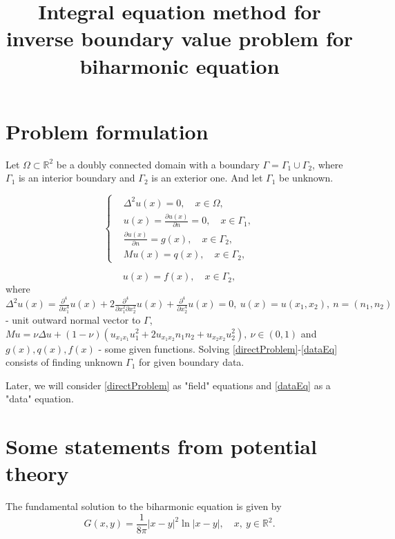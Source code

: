 \documentclass[12pt]{article}
\title{Integral equation method for inverse boundary value problem for biharmonic equation}
\date{}
\begin{document}
\maketitle

\section {Problem formulation}
Let $\Omega\subset \mathbb{R}^2$ be a doubly connected domain with a boundary $\Gamma=\Gamma_1\cup\Gamma_2$, where $\Gamma_1$ is an interior boundary and $\Gamma_2$ is an exterior one. And let $\Gamma_1$ be unknown.

\begin{equation}
	\left\{
	\label{directProblem}
	\begin{split}
		&\Delta^2 u(x)=0, \quad x\in\Omega, \\
		&u(x)=\frac{\partial u(x)}{\partial n}=0, \quad x\in\Gamma_1, \\
		&\frac{\partial u(x)}{\partial n}=g(x), \quad x\in\Gamma_2, \\
		&Mu(x)=q(x), \quad x\in\Gamma_2,
	\end{split}
	\right.
\end{equation}

\begin{equation}
	\label{dataEq}
	u(x)=f(x), \quad x\in\Gamma_2,
\end{equation}
where $\Delta^{2}u(x)=\frac{\partial^{4}}{\partial x_1^4}u(x)+2\frac{\partial^{4}}{\partial x_1^2\partial x_2^2}u(x)+\frac{\partial^{4}}{\partial x_2^4}u(x)=0,\ u(x)=u(x_1,x_2), \ n=(n_1, n_2)$ - unit outward normal vector to $\Gamma$, $Mu=\nu\Delta u+(1-\nu)(u_{x_1 x_1}u_1^2+2u_{x_1 x_2}n_1 n_2+u_{x_2 x_2}u_2^2), \ \nu\in (0, 1)$ and $g(x),q(x),f(x)$ - some given functions. Solving \eqref{directProblem}-\eqref{dataEq} consists of finding unknown $\Gamma_1$ for given boundary data.

Later, we will consider \eqref{directProblem} as "field" equations and \eqref{dataEq} as a "data" equation.

\section {Some statements from potential theory}

The fundamental solution to the biharmonic equation is given by
 \begin{equation}
 	G(x, y)=\frac{1}{8\pi}|x-y|^2\ln|x-y|, \quad x,\ y \in \mathbb{R}^2.
 \end{equation}
\end{document}
